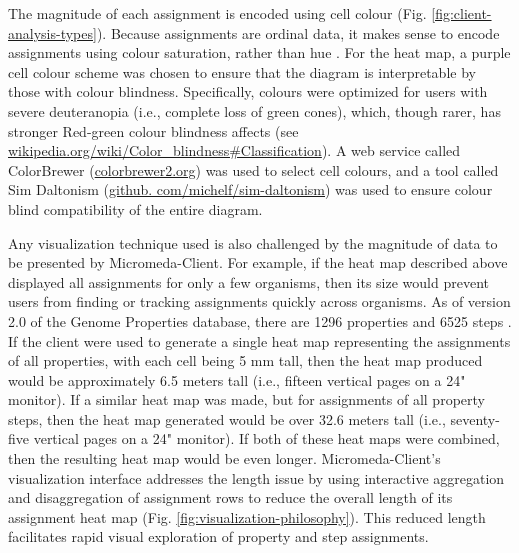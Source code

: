 The magnitude of each assignment is encoded using cell colour (Fig. \ref{fig:client-analysis-types}). Because assignments are ordinal data, it makes sense to encode assignments using colour saturation, rather than hue \cite{munzner2015visualization}. For the heat map, a purple cell colour scheme was chosen to ensure that the diagram is interpretable by those with colour blindness. Specifically, colours were optimized for users with severe deuteranopia (i.e., complete loss of green cones), which, though rarer, has stronger Red-green colour blindness affects (see \href{http://wikipedia.org/wiki/Color_blindness#Classification}{wikipedia.org/wiki/Color\_blindness\#Classification}). A web service called ColorBrewer (\href{http://colorbrewer2.org}{colorbrewer2.org}) was used to select cell colours, and a tool called Sim Daltonism (\href{http://github.com/michelf/sim-daltonism}{github. com/michelf/sim-daltonism}) was used to ensure colour blind compatibility of the entire diagram. 

Any visualization technique used is also challenged by the magnitude of data to be presented by Micromeda-Client. For example, if the heat map described above displayed all assignments for only a few organisms, then its size would prevent users from finding or tracking assignments quickly across organisms. As of version 2.0 of the Genome Properties database, there are 1296 properties and 6525 steps \cite{richardson2018genome}. If the client were used to generate a single heat map representing the assignments of all properties, with each cell being 5 mm tall, then the heat map produced would be approximately 6.5 meters tall (i.e., fifteen vertical pages on a 24" monitor). If a similar heat map was made, but for assignments of all property steps, then the heat map generated would be over 32.6 meters tall (i.e., seventy-five vertical pages on a 24" monitor). If both of these heat maps were combined, then the resulting heat map would be even longer. Micromeda-Client's visualization interface addresses the length issue by using interactive aggregation and disaggregation \cite{munzner2015visualization} of assignment rows to reduce the overall length of its assignment heat map (Fig. \ref{fig:visualization-philosophy}). This reduced length facilitates rapid visual exploration of property and step assignments.

